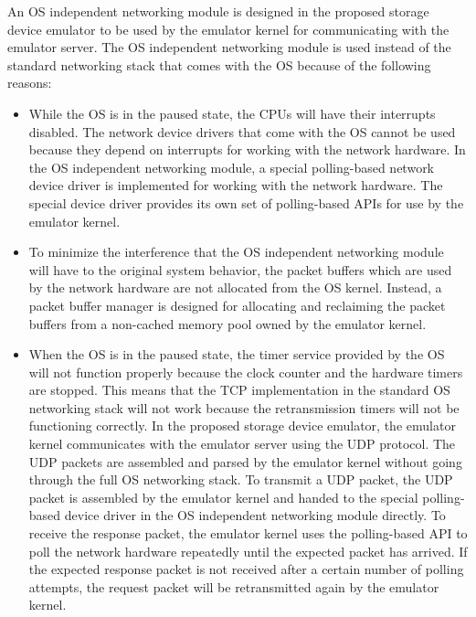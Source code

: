 An OS independent networking module is designed in the proposed storage device emulator to be used by the emulator kernel for communicating with the emulator server. The OS independent networking module is used instead of the standard networking stack that comes with the OS because of the following reasons:

\begin{itemize}
	\item While the OS is in the paused state, the CPUs will have their interrupts disabled. The network device drivers that come with the OS cannot be used because they depend on interrupts for working with the network hardware. In the OS independent networking module, a special polling-based network device driver is implemented for working with the network hardware. The special device driver provides its own set of polling-based APIs for use by the emulator kernel.
	
	\item To minimize the interference that the OS independent networking module will have to the original system behavior, the packet buffers which are used by the network hardware are not allocated from the OS kernel. Instead, a packet buffer manager is designed for allocating and reclaiming the packet buffers from a non-cached memory pool owned by the emulator kernel.
	
	\item When the OS is in the paused state, the timer service provided by the OS will not function properly because the clock counter and the hardware timers are stopped. This means that the TCP implementation in the standard OS networking stack will not work because the retransmission timers will not be functioning correctly. In the proposed storage device emulator, the emulator kernel communicates with the emulator server using the UDP protocol. The UDP packets are assembled and parsed by the emulator kernel without going through the full OS networking stack. To transmit a UDP packet, the UDP packet is assembled by the emulator kernel and handed to the special polling-based device driver in the OS independent networking module directly. To receive the response packet, the emulator kernel uses the polling-based API to poll the network hardware repeatedly until the expected packet has arrived. If the expected response packet is not received after a certain number of polling attempts, the request packet will be retransmitted again by the emulator kernel.
\end{itemize}

